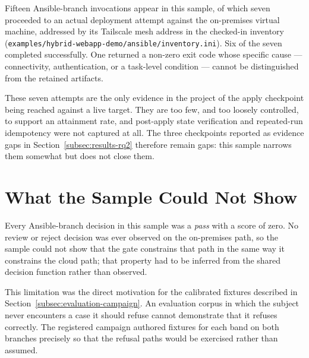 Fifteen Ansible-branch invocations appear in this sample, of which seven
proceeded to an actual deployment attempt against the on-premises virtual
machine, addressed by its Tailscale mesh address in the checked-in inventory
(\texttt{examples/hybrid-webapp-demo/ansible/inventory.ini}). Six of the seven
completed successfully. One returned a non-zero exit code whose specific cause
--- connectivity, authentication, or a task-level condition --- cannot be
distinguished from the retained artifacts.

These seven attempts are the only evidence in the project of the apply
checkpoint being reached against a live target. They are too few, and too
loosely controlled, to support an attainment rate, and post-apply state
verification and repeated-run idempotency were not captured at all. The three
checkpoints reported as evidence gaps in
Section~\ref{subsec:results-rq2} therefore remain gaps: this sample narrows them
somewhat but does not close them.

\section{What the Sample Could Not Show}

Every Ansible-branch decision in this sample was a \emph{pass} with a score of
zero. No review or reject decision was ever observed on the on-premises path, so
the sample could not show that the gate constrains that path in the same way it
constrains the cloud path; that property had to be inferred from the shared
decision function rather than observed.

This limitation was the direct motivation for the calibrated fixtures described
in Section~\ref{subsec:evaluation-campaign}. An evaluation corpus in which the
subject never encounters a case it should refuse cannot demonstrate that it
refuses correctly. The registered campaign authored fixtures for each band on
both branches precisely so that the refusal paths would be exercised rather than
assumed.
